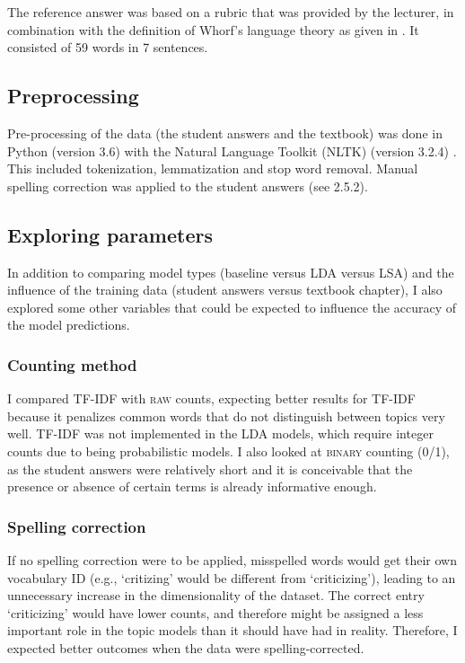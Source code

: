 \documentclass[a4paper,10pt,twoside]{article}
\begin{document}
The reference answer was based on a rubric that was provided by the lecturer, in combination with the definition of Whorf's language theory as given in . It consisted of 59 words in 7 sentences.

\subsection{Preprocessing}
Pre-processing of the data (the student answers and the textbook) was done in Python (version 3.6) with the Natural Language Toolkit (NLTK) (version 3.2.4) \cite{bird2009}. This included tokenization, lemmatization and stop word removal. Manual spelling correction was applied to the student answers (see 2.5.2).

\subsection{Exploring parameters}
\label{sec:exploring}
In addition to comparing model types (baseline versus LDA versus LSA) and the influence of the training data (student answers versus textbook chapter), I also explored some other variables that could be expected to influence the accuracy of the model predictions.

\subsubsection{Counting method}
\label{sec:countingmethod}
I compared TF-IDF with \textsc{raw} counts, expecting better results for TF-IDF because it penalizes common words that do not distinguish between topics very well. TF-IDF was not implemented in the LDA models, which require integer counts due to being probabilistic models. I also looked at \textsc{binary} counting (0/1), as the student answers were relatively short and it is conceivable that the presence or absence of certain terms is already informative enough.

\subsubsection{Spelling correction}
If no spelling correction were to be applied, misspelled words would get their own vocabulary ID (e.g., `critizing' would be different from `criticizing'), leading to an unnecessary increase in the dimensionality of the dataset. The correct entry `criticizing' would have lower counts, and therefore might be assigned a less important role in the topic models than it should have had in reality. Therefore, I expected better outcomes when the data were spelling-corrected.
\end{document}
